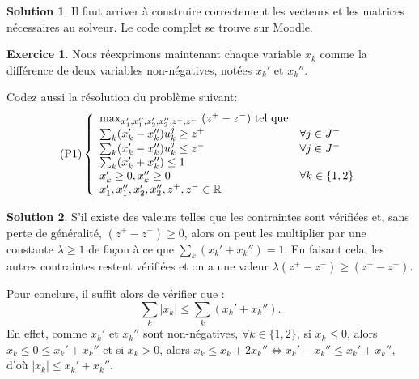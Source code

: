 \documentclass[a4paper,francais]{article}
\newcommand{\R}{{\ensuremath\mathbb{R}}}
\theoremstyle{definition}
\newtheorem{exercice}{Exercice}[section]
\newtheorem*{solution}{Solution}
\begin{document}
\begin{solution}
  Il faut arriver à construire correctement les vecteurs et les matrices nécessaires
  au solveur.
  Le code complet se trouve sur Moodle.  
\end{solution}

\begin{exercice}
  Nous réexprimons maintenant chaque variable $x_k$
  comme la différence de deux variables non-négatives,
  notées $x_k'$ et $x_k''$. 

  Codez aussi la résolution du problème suivant: 
  \[
  \text{(P1)}
  \left\{
  \begin{array}{ll}
    \max_{x_1',x_1'',x_2',x_2'',z^+,z^-} \  (z^+ - z^-) \ \text{tel que} & \\
    \sum_k (x_k' - x_k'') u_k^j \geq z^+ & \forall j \in J^+ \\ 
    \sum_k (x_k' - x_k'') u_k^j \leq z^- & \forall j \in J^- \\
    \sum_k (x_k' + x_k'') \leq 1 \\
    x_k' \geq 0, x_k'' \geq 0 & \forall k \in \{1, 2\} \\
    x_1',x_1'',x_2',x_2'',z^+,z^- \in \R \\
  \end{array}
  \right.
  \]
\end{exercice}

\begin{solution}
  S'il existe des valeurs telles que
  les contraintes sont vérifiées et, sans perte de généralité,
  $(z^+ - z^-) \geq 0$, alors on peut les multiplier par une
  constante $\lambda \geq 1$ de façon à ce que $\sum_k (x_k' + x_k'') = 1$.
  En faisant cela, les autres contraintes restent vérifiées
  et on a une valeur $\lambda(z^+ - z^-) \geq (z^+ - z^-)$.
  
  Pour conclure, il suffit alors de vérifier que :
  \[ \sum_k |x_k| \leq \sum_k (x_k' + x_k''). \]
  En effet, comme $x_k'$ et $x_k''$ sont non-négatives, $\forall k \in \{1, 2\}$,
  si $x_k \leq 0$, alors $x_k \leq 0 \leq x_k' + x_k''$
  et si $x_k > 0$, alors $x_k \leq x_k + 2x_k'' \Leftrightarrow x_k' - x_k'' \leq x_k' + x_k''$,
  d'où $|x_k| \leq x_k' + x_k''$.
\end{solution}
\end{document}
